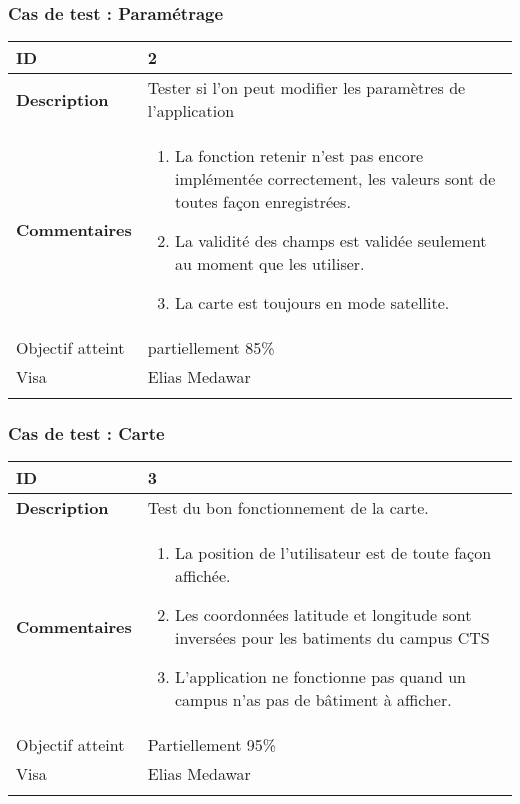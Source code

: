 		  		\subsubsection*{Cas de test : Paramétrage}
		 		 \begin{longtable}{m{4cm}|p{10cm}|}
		 		 \textbf{ ID} & 2 \\
		 		 \hline \textbf{Description} & Tester si l'on peut modifier les paramètres de l'application\\
		 		 \hline \textbf{Commentaires} & 
		 		 	 	 \begin{enumerate}
		 				  		\item La fonction retenir n'est pas encore implémentée correctement, les valeurs sont de toutes façon enregistrées.
		 				  		\item La validité des champs est validée seulement au moment que les utiliser.
		 				  		\item La carte est toujours en mode satellite.
		 				  	\end{enumerate} \\
		  				\hline Objectif atteint &  {\color{red}partiellement 85\% \XBox} \\
		  				\hline Visa & Elias Medawar 	\\
		 		 \\
		 		  \end{longtable} 		 		 
		 		 \subsubsection*{Cas de test : Carte}
		 		 		 \begin{longtable}{m{4cm}|p{10cm}|}
		 		 		 \textbf{ ID} & 3 \\
		 		 		 \hline \textbf{Description} &  Test du bon fonctionnement de la carte.\\
		 		 		 \hline \textbf{Commentaires} &  
		 		 		 	 	 \begin{enumerate}
	 		 		 		 	 		\item La position de l'utilisateur est de toute façon affichée.
	 		 							\item Les coordonnées latitude et longitude sont inversées pour les batiments du campus CTS
	 		 							\item {\color{red}L'application ne fonctionne pas quand un campus n'as pas de bâtiment à afficher}.
	 		 		 		 	\end{enumerate} \\
	 		 		 		  				\hline Objectif atteint & {\color{orange} Partiellement 95\% \XBox } \\
	 		 		 		  				\hline Visa & Elias Medawar 	\\
		 		 		 \\
		 		 \end{longtable} 
